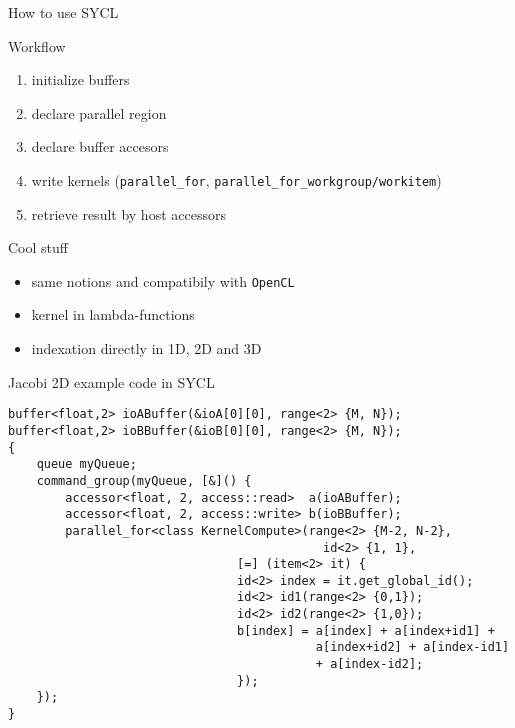 \documentclass[10pt, compress]{beamer}
\begin{document}
\begin{frame}[fragile]{How to use SYCL}

\begin{block}{Workflow}
\begin{enumerate}
\item initialize buffers
\item declare parallel region
\item declare buffer accesors
\item write kernels (\verb!parallel_for!, \verb!parallel_for_workgroup/workitem!)
\item retrieve result by host accessors
\end{enumerate}
\end{block}

\begin{block}{Cool stuff}
\begin{itemize}
\item same notions and compatibily with \texttt{OpenCL}
\item kernel in lambda-functions
\item indexation directly in 1D, 2D and 3D
\end{itemize}
\end{block}

\end{frame}


\begin{frame}[fragile]{Jacobi 2D example code in SYCL}

\begin{verbatim}
buffer<float,2> ioABuffer(&ioA[0][0], range<2> {M, N});
buffer<float,2> ioBBuffer(&ioB[0][0], range<2> {M, N});
{    
    queue myQueue;
    command_group(myQueue, [&]() {
        accessor<float, 2, access::read>  a(ioABuffer);
        accessor<float, 2, access::write> b(ioBBuffer);
        parallel_for<class KernelCompute>(range<2> {M-2, N-2}, 
                                            id<2> {1, 1},
                                [=] (item<2> it) {
                                id<2> index = it.get_global_id();
                                id<2> id1(range<2> {0,1});
                                id<2> id2(range<2> {1,0});
                                b[index] = a[index] + a[index+id1] + 
                                           a[index+id2] + a[index-id1] 
                                           + a[index-id2];
                                });
    });
}
\end{verbatim}

\end{frame}
\end{document}

